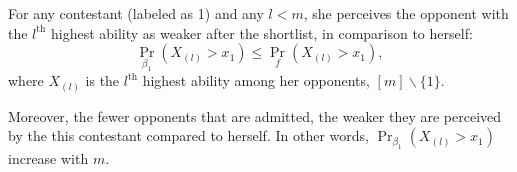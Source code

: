 
\begin{proposition}\label{prop:ThreatenDesc}
For any contestant (labeled as 1) and any $l < m$, she perceives the opponent with the $l^{\text{th}}$ highest ability as weaker after the shortlist, in comparison to herself:
\[
\Pr_{\beta_1}(X_{(l)} > x_1) \leq \Pr_{f}(X_{(l)}>x_1),
\]
where $X_{(l)}$ is the $l^{\text{th}}$ highest ability among her opponents, $[m]\backslash\{1\}$. 

Moreover, the fewer opponents that are admitted, the weaker they are perceived by the this contestant compared to herself. In other words, $\Pr_{\beta_1}(X_{(l)} > x_1)$ increase with $m$. 
\end{proposition}

